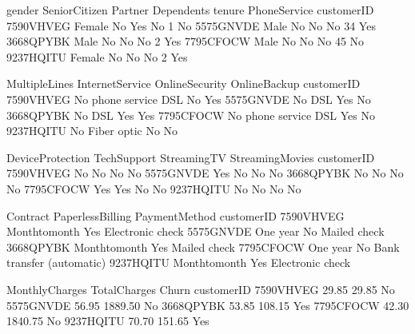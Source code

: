 \documentclass[letterpaper,10pt,english]{jupyterBook}
\begin{document}
\begin{sphinxVerbatim}[commandchars=\\\{\}]
            gender SeniorCitizen Partner Dependents  tenure PhoneService  \PYGZbs{}
customerID                                                                 
7590\PYGZhy{}VHVEG  Female            No     Yes         No       1           No   
5575\PYGZhy{}GNVDE    Male            No      No         No      34          Yes   
3668\PYGZhy{}QPYBK    Male            No      No         No       2          Yes   
7795\PYGZhy{}CFOCW    Male            No      No         No      45           No   
9237\PYGZhy{}HQITU  Female            No      No         No       2          Yes   

               MultipleLines InternetService OnlineSecurity OnlineBackup  \PYGZbs{}
customerID                                                                 
7590\PYGZhy{}VHVEG  No phone service             DSL             No          Yes   
5575\PYGZhy{}GNVDE                No             DSL            Yes           No   
3668\PYGZhy{}QPYBK                No             DSL            Yes          Yes   
7795\PYGZhy{}CFOCW  No phone service             DSL            Yes           No   
9237\PYGZhy{}HQITU                No     Fiber optic             No           No   

           DeviceProtection TechSupport StreamingTV StreamingMovies  \PYGZbs{}
customerID                                                            
7590\PYGZhy{}VHVEG               No          No          No              No   
5575\PYGZhy{}GNVDE              Yes          No          No              No   
3668\PYGZhy{}QPYBK               No          No          No              No   
7795\PYGZhy{}CFOCW              Yes         Yes          No              No   
9237\PYGZhy{}HQITU               No          No          No              No   

                  Contract PaperlessBilling              PaymentMethod  \PYGZbs{}
customerID                                                               
7590\PYGZhy{}VHVEG  Month\PYGZhy{}to\PYGZhy{}month              Yes           Electronic check   
5575\PYGZhy{}GNVDE        One year               No               Mailed check   
3668\PYGZhy{}QPYBK  Month\PYGZhy{}to\PYGZhy{}month              Yes               Mailed check   
7795\PYGZhy{}CFOCW        One year               No  Bank transfer (automatic)   
9237\PYGZhy{}HQITU  Month\PYGZhy{}to\PYGZhy{}month              Yes           Electronic check   

            MonthlyCharges  TotalCharges Churn  
customerID                                      
7590\PYGZhy{}VHVEG           29.85         29.85    No  
5575\PYGZhy{}GNVDE           56.95       1889.50    No  
3668\PYGZhy{}QPYBK           53.85        108.15   Yes  
7795\PYGZhy{}CFOCW           42.30       1840.75    No  
9237\PYGZhy{}HQITU           70.70        151.65   Yes  
\end{sphinxVerbatim}
\end{document}
